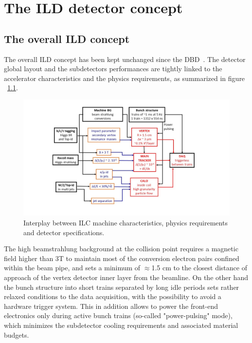 \chapter{The ILD detector concept}


\section{The overall ILD concept}

The overall ILD concept has been kept unchanged since the DBD~\cite{ild:bib:ILDDBD}. The detector global layout and the subdetectors performances are tightly linked to the accelerator characteristics and the physics requirements, as summarized in figure ~\ref{fig:ILD:specifications}. 

\begin{figure}[t!]
\centering
\includegraphics[width=1.2\hsize]{ILD/fig/ILD_specifications.jpg}
\caption{Interplay between ILC machine characteristics, physics requirements and detector specifications.}
\label{fig:ILD:specifications}
\end{figure}
	
The high beamstrahlung background at the collision point requires a magnetic field higher than 3T to maintain most of the conversion electron pairs confined within the beam pipe, and sets a minimum of $\approx$1.5 cm to the closest distance of approach of the vertex detector inner layer from the beamline. On the other hand the bunch structure into short trains separated by long idle periods sets rather relaxed conditions to the data acquisition, with the possibility to avoid a hardware trigger system. This in addition allows to power the front-end electronics only during active bunch trains (so-called "power-pulsing" mode), which minimizes the subdetector cooling requirements and associated material budgets.  

